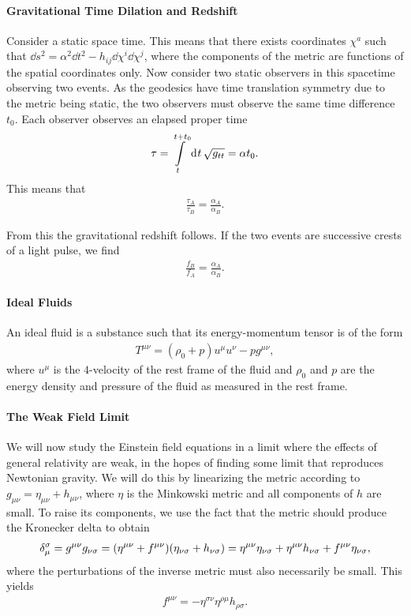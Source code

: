 \paragraph{Gravitational Time Dilation and Redshift}
Consider a static space time. This means that there exists coordinates $\chi^{a}$ such that $\dd{s}^{2} = \alpha^{2}\dd{t}^{2} - h_{ij}\dd{\chi}^{i}\dd{\chi}^{j}$, where the components of the metric are functions of the spatial coordinates only. Now consider two static observers in this spacetime observing two events. As the geodesics have time translation symmetry due to the metric being static, the two observers must observe the same time difference $t_{0}$. Each observer observes an elapsed proper time
\begin{align*}
	\tau = \int\limits_{t}^{t + t_{0}}\dd[]{t}\sqrt{g_{tt}} = \alpha t_{0}.
\end{align*}
This means that
\begin{align*}
	\frac{\tau_{A}}{\tau_{B}} = \frac{\alpha_{A}}{\alpha_{B}}.
\end{align*}

From this the gravitational redshift follows. If the two events are successive crests of a light pulse, we find
\begin{align*}
	\frac{f_{B}}{f_{A}} = \frac{\alpha_{A}}{\alpha_{B}}.
\end{align*}

\paragraph{Ideal Fluids}
An ideal fluid is a substance such that its energy-momentum tensor is of the form
\begin{align*}
	T^{\mu\nu} = (\rho_{0} + p)u^{\mu}u^{\nu} - pg^{\mu\nu},
\end{align*}
where $u^{\mu}$ is the $4$-velocity of the rest frame of the fluid and $\rho_{0}$ and $p$ are the energy density and pressure of the fluid as measured in the rest frame.

\paragraph{The Weak Field Limit}
We will now study the Einstein field equations in a limit where the effects of general relativity are weak, in the hopes of finding some limit that reproduces Newtonian gravity. We will do this by linearizing the metric according to $g_{\mu\nu} = \eta_{\mu\nu} + h_{\mu\nu}$, where $\eta$ is the Minkowski metric and all components of $h$ are small. To raise its components, we use the fact that the metric should produce the Kronecker delta to obtain
\begin{align*}
	\kdelta{\mu}{\sigma} = g^{\mu\nu}g_{\nu\sigma} = (\eta^{\mu\nu} + f^{\mu\nu})(\eta_{\nu\sigma} + h_{\nu\sigma}) = \eta^{\mu\nu}\eta_{\nu\sigma} + \eta^{\mu\nu}h_{\nu\sigma} + f^{\mu\nu}\eta_{\nu\sigma},
\end{align*}
where the perturbations of the inverse metric must also necessarily be small. This yields
\begin{align*}
	f^{\mu\nu} = -\eta^{\sigma\nu}\eta^{\rho\mu}h_{\rho\sigma}.
\end{align*}

